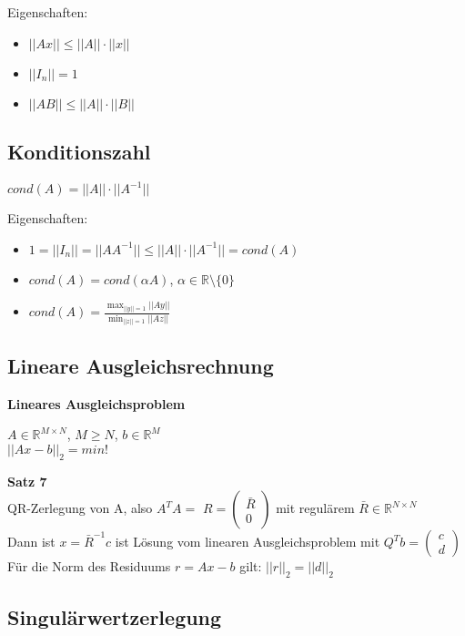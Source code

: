 \documentclass[a4paper]{article}
\begin{document}
Eigenschaften:
\begin{itemize}
    \item $||Ax|| \le ||A||\cdot||x||$
    \item $||I_n|| = 1$
    \item $||AB|| \le ||A||\cdot||B||$
\end{itemize}

\subsection{Konditionszahl}

$cond(A) = ||A|| \cdot ||A^{-1}||$

\vspace{1em}
Eigenschaften:
\begin{itemize}
    \item $1 = ||I_n|| = ||AA^{-1}|| \le ||A|| \cdot ||A^{-1}|| = cond(A)$
    \item $cond(A) = cond(\alpha A)$, $\alpha \in \mathbb{R} \setminus \{0\}$
    \item $cond(A) = \frac{\max_{||y|| = 1} ||Ay||}{\min_{||z|| = 1} ||Az||}$
\end{itemize}

\subsection{Lineare Ausgleichsrechnung}

\textbf{Lineares Ausgleichsproblem}

$A \in \mathbb{R}^{M \times N}$,
$M \ge N$,
$b \in \mathbb{R}^M$
\\
$||Ax-b||_2 = min!$

\vspace{2em}
\textbf{Satz 7}
\\
QR-Zerlegung von A, also $A^T A = $
$R = \begin{pmatrix}\bar{R}\\0\end{pmatrix}$
mit regulärem $\bar{R} \in \mathbb{R}^{N \times N}$
\\
Dann ist $x = \bar{R}^{-1} c$ ist Lösung vom linearen Ausgleichsproblem mit
$Q^T b = \begin{pmatrix}c\\d\end{pmatrix}$
\\
Für die Norm des Residuums $r = Ax - b$ gilt: $||r||_2 = ||d||_2$ 

\subsection{Singulärwertzerlegung}
\end{document}
